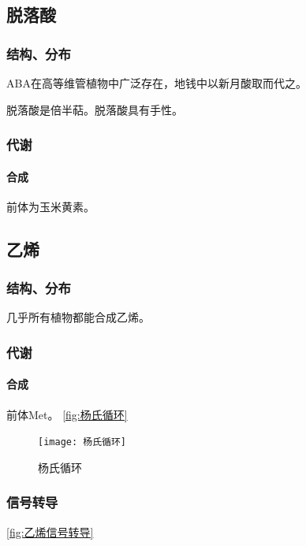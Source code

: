 \subsection{脱落酸}

\subsubsection{结构、分布}

ABA在高等维管植物中广泛存在，地钱中以新月酸取而代之。

脱落酸是倍半萜。脱落酸具有手性。

\subsubsection{代谢}

\paragraph{合成}

前体为玉米黄素。

\subsection{乙烯}

\subsubsection{结构、分布}

几乎所有植物都能合成乙烯。

\subsubsection{代谢}

\paragraph{合成}

前体Met。
\autoref{fig:杨氏循环}
\begin{figure}
	\centering
	\texttt{[image: 杨氏循环]}
	\caption{杨氏循环}
	\label{fig:杨氏循环}
\end{figure}


\subsubsection{信号转导}

\autoref{fig:乙烯信号转导}

